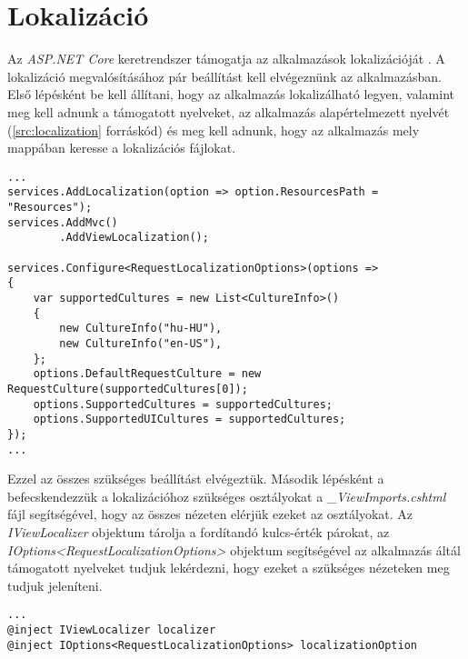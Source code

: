 \section{Lokalizáció}
\label{sec:localization}
Az \emph{ASP.NET Core} keretrendszer támogatja az alkalmazások lokalizációját \cite{Localization}. A lokalizáció megvalósításához pár beállítást kell elvégeznünk az alkalmazásban. Első lépésként be kell állítani, hogy az alkalmazás lokalizálható legyen, valamint meg kell adnunk a támogatott nyelveket, az alkalmazás alapértelmezett nyelvét (\ref{src:localization} forráskód) és meg kell adnunk, hogy az alkalmazás mely mappában keresse a lokalizációs fájlokat.
\begin{lstlisting}[language={[Sharp]C}]
...
services.AddLocalization(option => option.ResourcesPath = "Resources");
services.AddMvc()
		.AddViewLocalization();

services.Configure<RequestLocalizationOptions>(options =>
{
	var supportedCultures = new List<CultureInfo>()
	{
		new CultureInfo("hu-HU"),
		new CultureInfo("en-US"),
	};
	options.DefaultRequestCulture = new RequestCulture(supportedCultures[0]);
	options.SupportedCultures = supportedCultures;
	options.SupportedUICultures = supportedCultures;
});
...
\end{lstlisting}
Ezzel az összes szükséges beállítást elvégeztük. Második lépésként a befecskendezzük a lokalizációhoz szükséges osztályokat a \emph{\_ViewImports.cshtml} fájl segítségével, hogy az összes nézeten elérjük ezeket az osztályokat. Az \emph{IViewLocalizer} objektum tárolja a fordítandó kulcs-érték párokat, az \emph{IOptions<RequestLocalizationOptions>} objektum segítségével az alkalmazás áltál támogatott nyelveket tudjuk lekérdezni, hogy ezeket a szükséges nézeteken meg tudjuk jeleníteni.
\begin{lstlisting}[language={[Sharp]C}]
...
@inject IViewLocalizer localizer
@inject IOptions<RequestLocalizationOptions> localizationOption
\end{lstlisting}
